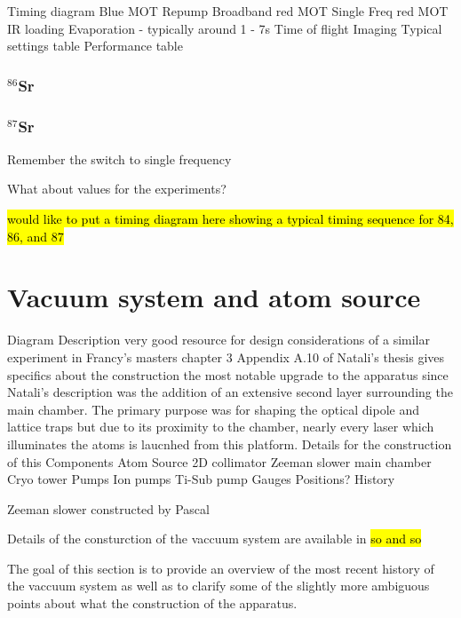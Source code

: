 Timing diagram
	Blue MOT
	Repump
	Broadband red MOT
	Single Freq red MOT
	IR loading
	Evaporation - typically around 1 - 7s
	Time of flight
	Imaging
Typical settings table
Performance table

\subsubsection{$^{86}$Sr} \label{sec:86_trapping}

\subsubsection{$^{87}$Sr} \label{sec:87_trapping}


Remember the switch to single frequency

What about values for the experiments?

\hl{would like to put a timing diagram here showing a typical timing sequence for 84, 86, and 87}



\section{Vacuum system and atom source}
\label{sec:vac}

Diagram
Description
	very good resource for design considerations of a similar experiment in Francy's masters chapter 3
	Appendix A.10 of Natali's thesis gives specifics about the construction
		the most notable upgrade to the apparatus since Natali's description was the addition of an extensive second layer surrounding the main chamber. The primary purpose was for shaping the optical dipole and lattice traps but due to its proximity to the chamber, nearly every laser which illuminates the atoms is laucnhed from this platform. Details for the construction of this 
Components
	Atom Source
	2D collimator
	Zeeman slower
	main chamber
	Cryo tower
	Pumps
		Ion pumps
		Ti-Sub pump
	Gauges
		Positions?
History
	

	
Zeeman slower
	constructed by Pascal
	


Details of the consturction of the vaccuum system are available in \hl{so and so}

The goal of this section is to provide an overview of the most recent history of the vaccuum system as well as to clarify some of the slightly more ambiguous points about what the construction of the apparatus.


